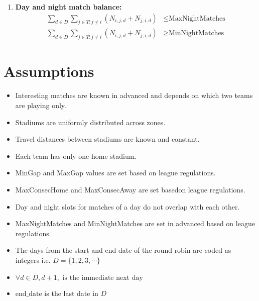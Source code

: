 \documentclass[a4paper, 12pt]{article}
\begin{document}
\begin{enumerate}
    \item \textbf{Day and night match balance:}
    \begin{align*}
        \sum_{d \in D} \sum_{j \in T : j \neq i} (N_{i,j,d} + N_{j,i,d}) &\leq \text{MaxNightMatches} \\
        \sum_{d \in D} \sum_{j \in T : j \neq i} (N_{i,j,d} + N_{j,i,d}) &\geq \text{MinNightMatches}
    \end{align*}
\end{enumerate}

\section*{Assumptions}
\begin{itemize}
    \item Interesting matches are known in advanced and depends on which two teams are playing only.
    \item Stadiums are uniformly distributed across zones.
    \item Travel distances between stadiums are known and constant.
    \item Each team has only one home stadium.
    \item MinGap and MaxGap values are set based on league regulations.
    \item MaxConsecHome and MaxConsecAway are set basedon league regulations.
    \item Day and night slots for matches of a day do not overlap with each other.
    \item MaxNightMatches and MinNightMatches are set in advanced based on league regulations.
    \item The days from the start and end date of the round robin are coded as integers i.e. $D = \{1,2,3, \cdots \}$
    \item $\forall d \in D, d+1, \text{ is the immediate next day}$ 
    \item $\text{end\_date}$ is the last date in $D$
\end{itemize}




\end{document}

